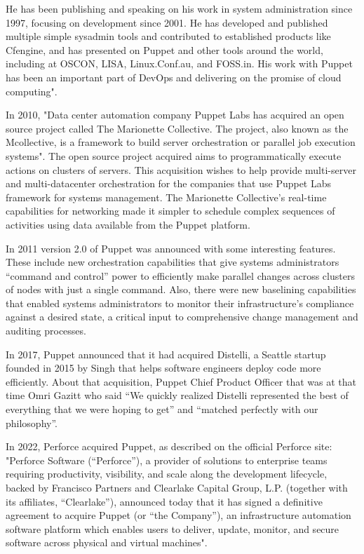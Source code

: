 \documentclass[12pt,a4paper,openright,twoside]{book}
\begin{document}
He has been publishing and speaking on his work in system administration since 1997, focusing on development since 2001. He has developed and published multiple simple sysadmin tools and contributed to established products like Cfengine, and has presented on Puppet and other tools around the world, including at OSCON, LISA, Linux.Conf.au, and FOSS.in. His work with Puppet has been an important part of DevOps and delivering on the promise of cloud computing".\cite{puppetStory1}


In 2010, "Data center automation company Puppet Labs has acquired an open source project called The Marionette Collective. The project, also known as the Mcollective, is a framework to build server orchestration or parallel job execution systems".\cite{puppetStory2}
The open source project acquired aims to programmatically execute actions on clusters of servers.
This acquisition wishes to help provide multi-server and multi-datacenter orchestration for the companies that use Puppet Labs framework for systems management.
The Marionette Collective's real-time capabilities for networking made it simpler to schedule complex sequences of activities using data available from the Puppet platform.\cite{puppetStory2}


In 2011 version 2.0 of Puppet was announced with some interesting features. These include new orchestration capabilities that give systems administrators “command and control”
power to efficiently make parallel changes across clusters of nodes with just a single
command. Also, there were new baselining capabilities that enabled systems administrators to monitor their
infrastructure's compliance against a desired state, a critical input to comprehensive
change management and auditing processes\cite{puppetStory3}.


In 2017, Puppet announced that it had acquired Distelli, a Seattle startup founded in 2015 by Singh that helps software engineers deploy code more efficiently.\cite{puppetStory4}
About that acquisition, Puppet Chief Product Officer that was at that time Omri Gazitt who said “We quickly realized Distelli represented the best of everything that we were hoping to get” and “matched perfectly with our philosophy”\cite{puppetStory4}.


In 2022, Perforce acquired Puppet, as described on the official Perforce site:
"Perforce Software (“Perforce”), a provider of solutions to enterprise teams requiring productivity, visibility, and scale along the development lifecycle, backed by Francisco Partners and Clearlake Capital Group, L.P. (together with its affiliates, “Clearlake”), announced today that it has signed a definitive agreement to acquire Puppet (or “the Company”), an infrastructure automation software platform which enables users to deliver, update, monitor, and secure software across physical and virtual machines"\cite{puppetStory5}.
\end{document}
